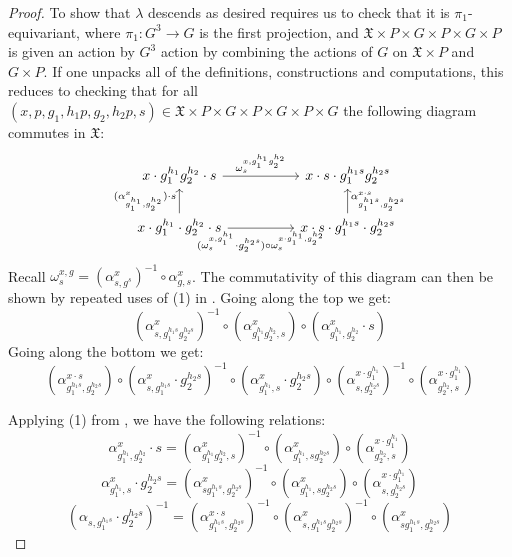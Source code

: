 \documentclass[10pt,a4paper]{amsart}
\newcommand{\fX}{{\mathfrak X}}
\begin{document}
\begin{proof}
    To show that $\lambda$ descends as desired requires us to check that it is 
    $\pi_1$-equivariant, where $\pi_1:G^{3} \to G$ is the first projection,
    and $\fX\times P \times G \times P \times G \times P$ is given an action by 
    $G^{3}$ action by combining the actions of $G$ on $\fX \times P$ and 
    $G \times P$. If one unpacks all of the definitions, constructions and computations, 
    this reduces to checking that for all 
    $(x,p,g_{1},h_{1}p,g_{2},h_{2}p,s) \in \fX\times P \times G \times P \times G \times P \times G$
    the following diagram commutes in $\fX$:
    $$
    \begin{tikzcd}[column sep=huge]
        {x\cdot g_{1}^{h_{1}}g_{2}^{h_{2}}\cdot s} & {x\cdot s\cdot g_{1}^{h_{1}s}g_{2}^{h_{2}s}} \\
        {x\cdot g_{1}^{h_{1}}\cdot g_{2}^{h_{2}}\cdot s} & {x\cdot s\cdot g_{1}^{h_{1}s}\cdot g_{2}^{h_{2}s}}
        \arrow["{\omega_{s}^{x,g_{1}^{h_{1}}g_{2}^{h_{2}}}}", from=1-1, to=1-2]
        \arrow["{(\alpha_{g_{1}^{h_{1}},g_{2}^{h_{2}}}^{x})\cdot s}", from=2-1, to=1-1]
        \arrow["{(\omega_{s}^{x,g_{1}^{h_{1}}}\cdot g_{2}^{h_{2}s})\circ\omega_{s}^{x\cdot g_{1}^{h_{1}},g_{2}^{h_{2}}}}"', from=2-1, to=2-2]
        \arrow["{\alpha_{g_{1}^{h_{1}s},g_{2}^{h_{2}s}}^{x\cdot s}}"', from=2-2, to=1-2]
    \end{tikzcd}
    $$
    Recall $\omega_{s}^{x,g} = (\alpha_{s,g^{s}}^{x})^{-1} \circ \alpha_{g,s}^{x}$.
    The commutativity of this diagram can then be shown by repeated uses of (1) in 
    .
    \iffalse
    Going along the top we get:
    $$(\alpha_{s,g_{1}^{h_{1}s}g_{2}^{h_{2}s}}^{x})^{-1}\circ (\alpha_{g_{1}^{h_{1}}g_{2}^{h_{2}},s}^{x})\circ(\alpha_{g_{1}^{h_{1}},g_{2}^{h_{2}}}^{x}\cdot s) $$
    Going along the bottom we get:
    $$(\alpha_{g_{1}^{h_{1}s},g_{2}^{h_{2}s}}^{x\cdot s}) \circ (\alpha_{s,g_{1}^{h_{1}s}}^{x}\cdot g_{2}^{h_{2}s})^{-1}\circ (\alpha_{g_{1}^{h_{1}},s}^{x}\cdot g_{2}^{h_{2}s})\circ (\alpha_{s,g_{2}^{h_{2}s}}^{x\cdot g_{1}^{h_{1}}})^{-1}\circ(\alpha_{g_{2}^{h_{2}},s}^{x\cdot g_{1}^{h_{1}}}) $$

    Applying (1) from , we have the following relations:
    $$\alpha_{g_{1}^{h_{1}},g_{2}^{h_{2}}}^{x} \cdot s = (\alpha_{g_{1}^{h_{1}}g_{2}^{h_{2}},s}^{x})^{-1}\circ (\alpha_{g_{1}^{h_{1}},sg_{2}^{h_{2}s}}^{x})\circ (\alpha_{g_{2}^{h_{2}},s}^{x\cdot g_{1}^{h_{1}}})$$
    $$\alpha_{g_{1}^{h_{1}},s}^{x} \cdot g_{2}^{h_{2}s} = (\alpha_{sg_{1}^{h_{1}s},g_{2}^{h_{2}s}}^{x})^{-1}\circ (\alpha_{g_{1}^{h_{1}},sg_{2}^{h_{2}s}}^{x})\circ (\alpha_{s,g_{2}^{h_{2}s}}^{x\cdot g_{1}^{h_{1}}})$$
    $$(\alpha_{s,g_{1}^{h_{1}s}}\cdot g_{2}^{h_{2}s})^{-1} = (\alpha_{g_{1}^{h_{1}s},g_{2}^{h_{2}s}}^{x\cdot s})^{-1}\circ(\alpha_{s,g_{1}^{h_{1}s}g_{2}^{h_{2}s}}^{x})^{-1}\circ(\alpha_{sg_{1}^{h_{1}s},g_{2}^{h_{2}s}}^{x})$$


\end{proof}
\end{document}
